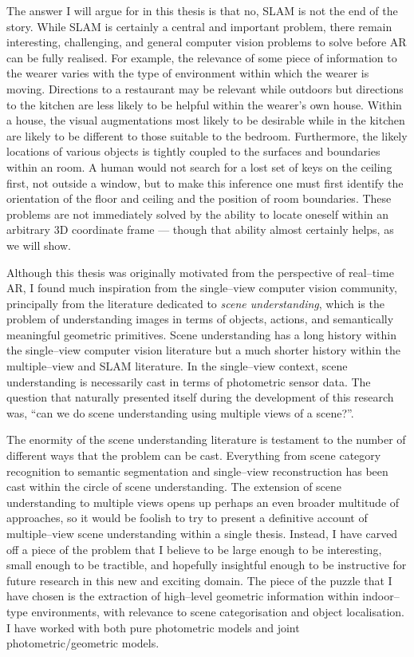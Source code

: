 The answer I will argue for in this thesis is that no, SLAM is not the
end of the story. While SLAM is certainly a central and important
problem, there remain interesting, challenging, and general computer
vision problems to solve before AR can be fully realised. For example,
the relevance of some piece of information to the wearer varies with
the type of environment within which the wearer is moving. Directions
to a restaurant may be relevant while outdoors but directions to the
kitchen are less likely to be helpful within the wearer's own
house. Within a house, the visual augmentations most likely to be
desirable while in the kitchen are likely to be different to those
suitable to the bedroom. Furthermore, the likely locations of various
objects is tightly coupled to the surfaces and boundaries within an
room. A human would not search for a lost set of keys on the ceiling
first, not outside a window, but to make this inference one must first
identify the orientation of the floor and ceiling and the position of
room boundaries. These problems are not immediately solved by the
ability to locate oneself within an arbitrary 3D coordinate frame ---
though that ability almost certainly helps, as we will show.

Although this thesis was originally motivated from the perspective of
real--time AR, I found much inspiration from the single--view computer
vision community, principally from the literature dedicated to
\textit{scene understanding}, which is the problem of understanding
images in terms of objects, actions, and semantically meaningful
geometric primitives. Scene understanding has a long history within
the single--view computer vision literature but a much shorter history
within the multiple--view and SLAM literature. In the single--view
context, scene understanding is necessarily cast in terms of
photometric sensor data. The question that naturally presented itself
during the development of this research was, ``can we do scene
understanding using multiple views of a scene?''.

The enormity of the scene understanding literature is testament to the
number of different ways that the problem can be cast. Everything from
scene category recognition to semantic segmentation and single--view
reconstruction has been cast within the circle of scene
understanding. The extension of scene understanding to multiple views
opens up perhaps an even broader multitude of approaches, so it would
be foolish to try to present a definitive account of multiple--view
scene understanding within a single thesis. Instead, I have carved off
a piece of the problem that I believe to be large enough to be
interesting, small enough to be tractible, and hopefully insightful
enough to be instructive for future research in this new and exciting
domain. The piece of the puzzle that I have chosen is the extraction
of high--level geometric information within indoor--type environments,
with relevance to scene categorisation and object localisation. I have
worked with both pure photometric models and joint
photometric/geometric models.

